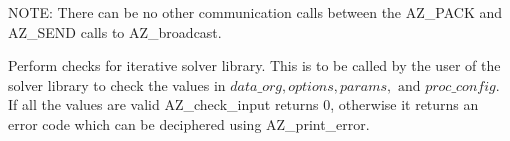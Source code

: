 NOTE:  There can be no other communication calls between the {\sf AZ\_PACK}
and {\sf AZ\_SEND} calls to {\sf AZ\_broadcast}.

\vspace{2em}
{ \hrulefill}
\vspace{1em}






\vspace{2em}
{ \hrulefill}
\vspace{1em}

Perform checks for iterative solver library. This is to be called by the user
of the solver library to check the values in $ data\_org, options, params,
\mbox{ and } proc\_config$.  If all the values are valid {\sf AZ\_check\_input}
returns 0, otherwise it returns an error code which can be deciphered using
{\sf AZ\_print\_error}.


%


%
%
%
%
%
%
%

